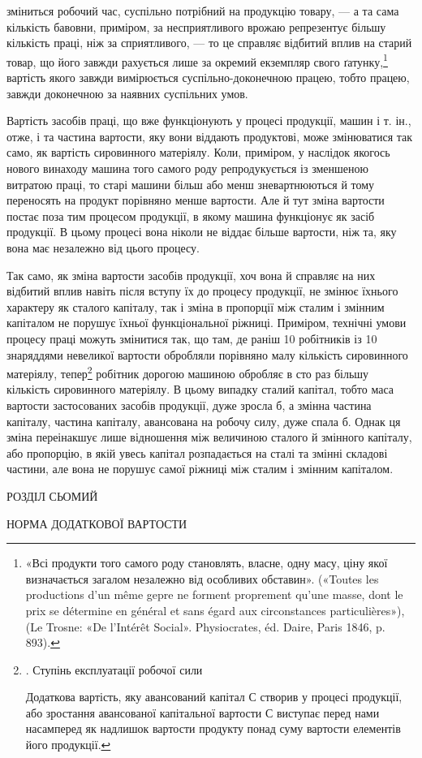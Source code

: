 \parcont{}  %
зміниться робочий час, суспільно потрібний на продукцію товару, — а та сама кількість бавовни,
приміром, за несприятливого врожаю репрезентує більшу кількість праці, ніж за сприятливого,
— то це справляє відбитий вплив на старий товар, що його завжди рахується лише за окремий екземпляр
свого ґатунку,\footnote{
«Всі продукти того самого роду становлять, власне, одну масу, ціну якої визначається загалом
незалежно від особливих обставин». («Toutes les productions d’un même gepre ne forment proprement
qu’une masse, dont le prix se détermine en général et sans égard aux circonstances particulières»),
(Le Trosne: «De l’Intérêt Social». Physiocrates, éd. Daire,
Paris 1846, p. 893).
}
вартість якого завжди вимірюється суспільно-доконечною працею, тобто працею, завжди доконечною за
наявних суспільних умов.

Вартість засобів праці, що вже функціонують у процесі продукції,
машин і т. ін., отже, і та частина вартости, яку вони віддають продуктові, може змінюватися так
само, як вартість сировинного матеріялу. Коли, приміром, у наслідок якогось нового винаходу машина
того самого роду репродукується із зменшеною витратою праці, то старі машини більш або менш
зневартнюються
й тому переносять на продукт порівняно менше вартости. Але й тут зміна вартости постає поза тим
процесом продукції,
в якому машина функціонує як засіб продукції. В цьому процесі вона ніколи не віддає більше вартости,
ніж та, яку вона має
незалежно від цього процесу.

Так само, як зміна вартости засобів продукції, хоч вона й справляє на них відбитий вплив навіть
після вступу їх до процесу продукції, не змінює їхнього характеру як сталого капіталу, так і зміна в
пропорції між сталим і змінним капіталом не порушує їхньої функціональної ріжниці. Приміром,
технічні умови процесу праці можуть змінитися так, що там, де раніш 10 робітників із 10 знаряддями
невеликої вартости обробляли порівняно малу кількість сировинного матеріялу, тепер\footnote{
. Ступінь експлуатації робочої сили

Додаткова вартість, яку авансований капітал С створив у процесі продукції, або зростання авансованої
капітальної вартости С виступає перед нами насамперед як надлишок вартости
продукту понад суму вартости елементів його продукції.
} робітник
дорогою машиною обробляє в сто раз більшу кількість сировинного матеріялу. В цьому випадку сталий
капітал, тобто маса вартости застосованих
засобів продукції, дуже зросла б, а змінна частина капіталу, частина капіталу, авансована на робочу
силу, дуже спала б.
Однак ця зміна переінакшує лише відношення між величиною сталого й змінного капіталу, або пропорцію,
в якій увесь капітал розпадається на сталі та змінні складові частини, але вона не
порушує самої ріжниці між сталим і змінним капіталом.

РОЗДІЛ СЬОМИЙ

НОРМА ДОДАТКОВОЇ ВАРТОСТИ
